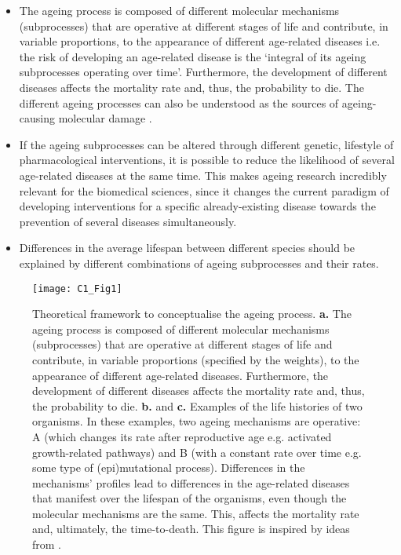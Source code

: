 \begin{itemize}
	
	\item The ageing process is composed of different molecular mechanisms (subprocesses) that are operative at different stages of life and contribute, in variable proportions, to the appearance of different age-related diseases i.e. the risk of developing an age-related disease is the `integral of its ageing subprocesses operating over time'. Furthermore, the development of different diseases affects the mortality rate and, thus, the probability to die. The different ageing processes can also be understood as the sources of ageing-causing molecular damage \cite{Lopez-Otin2013}.
	
	\item If the ageing subprocesses can be altered through different genetic, lifestyle of pharmacological interventions, it is possible to reduce the likelihood of several age-related diseases at the same time. This makes ageing research incredibly relevant for the biomedical sciences, since it changes the current paradigm of developing interventions for a specific already-existing disease towards the prevention of several diseases simultaneously.
	
	\item  Differences in the average lifespan between different species should be explained by different combinations of ageing subprocesses and their rates.
		
\end{itemize}	

\begin{figure}[htbp!] 
	\centering    
	\texttt{[image: C1\_Fig1]}
	\vspace*{1 mm}
	\caption[Theoretical framework to conceptualise the ageing process]{Theoretical framework to conceptualise the ageing process. \textbf{a.} The ageing process is composed of different molecular mechanisms (subprocesses) that are operative at different stages of life and contribute, in variable proportions (specified by the weights), to the appearance of different age-related diseases. Furthermore, the development of different diseases affects the mortality rate and, thus, the probability to die. \textbf{b.} and \textbf{c.} Examples of the life histories of two organisms. In these examples, two ageing mechanisms are operative: A (which changes its rate after reproductive age e.g. activated growth-related pathways) and B (with a constant rate over time e.g. some type of (epi)mutational process). Differences in the mechanisms' profiles lead to differences in the age-related diseases that manifest over the lifespan of the organisms, even though the molecular mechanisms are the same. This, affects the mortality rate and, ultimately, the time-to-death. This figure is inspired by ideas from \cite{Hayflick2007,Gems2015,Peto1997,Stroustrup2016,Freund2019}.}
	\label{fig:c1_fig1}
\end{figure}

